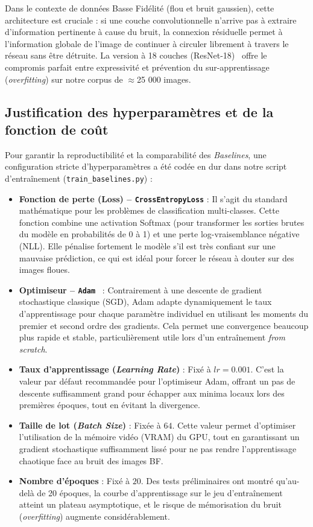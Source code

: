 \documentclass[11pt,a4paper,openany]{book}
\begin{document}
Dans le contexte de données Basse Fidélité (flou et bruit gaussien), cette architecture est cruciale : si une couche convolutionnelle n'arrive pas à extraire d'information pertinente à cause du bruit, la connexion résiduelle permet à l'information globale de l'image de continuer à circuler librement à travers le réseau sans être détruite. La version à 18 couches (ResNet-18)~\cite{resnet} offre le compromis parfait entre expressivité et prévention du sur-apprentissage (\textit{overfitting}) sur notre corpus de $\approx$25 000 images.

\subsection{Justification des hyperparamètres et de la fonction de coût}

Pour garantir la reproductibilité et la comparabilité des \textit{Baselines}, une configuration stricte d'hyperparamètres a été codée en dur dans notre script d'entraînement (\texttt{train\_baselines.py}) :

\begin{itemize}
    \item \textbf{Fonction de perte (Loss) -- \texttt{CrossEntropyLoss}} : Il s'agit du standard mathématique pour les problèmes de classification multi-classes. Cette fonction combine une activation Softmax (pour transformer les sorties brutes du modèle en probabilités de 0 à 1) et une perte log-vraisemblance négative (NLL). Elle pénalise fortement le modèle s'il est très confiant sur une mauvaise prédiction, ce qui est idéal pour forcer le réseau à douter sur des images floues.
    \item \textbf{Optimiseur -- \texttt{Adam}}~\cite{adam} : Contrairement à une descente de gradient stochastique classique (SGD), Adam adapte dynamiquement le taux d'apprentissage pour chaque paramètre individuel en utilisant les moments du premier et second ordre des gradients. Cela permet une convergence beaucoup plus rapide et stable, particulièrement utile lors d'un entraînement \textit{from scratch}.
    \item \textbf{Taux d'apprentissage (\textit{Learning Rate})} : Fixé à $lr = 0.001$. C'est la valeur par défaut recommandée pour l'optimiseur Adam, offrant un pas de descente suffisamment grand pour échapper aux minima locaux lors des premières époques, tout en évitant la divergence.
    \item \textbf{Taille de lot (\textit{Batch Size})} : Fixée à $64$. Cette valeur permet d'optimiser l'utilisation de la mémoire vidéo (VRAM) du GPU, tout en garantissant un gradient stochastique suffisamment lissé pour ne pas rendre l'apprentissage chaotique face au bruit des images BF.
    \item \textbf{Nombre d'époques} : Fixé à $20$. Des tests préliminaires ont montré qu'au-delà de 20 époques, la courbe d'apprentissage sur le jeu d'entraînement atteint un plateau asymptotique, et le risque de mémorisation du bruit (\textit{overfitting}) augmente considérablement.
\end{itemize}
\end{document}
